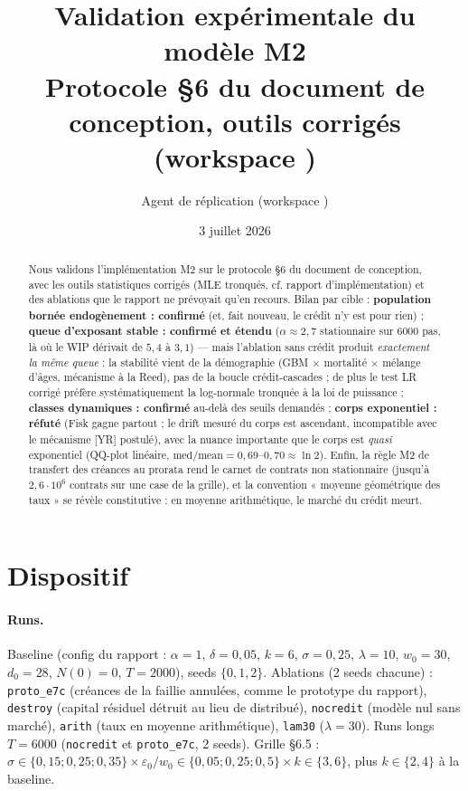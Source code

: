 \documentclass[11pt,a4paper]{article}
\title{Validation expérimentale du modèle M2\\
\large Protocole §6 du document de conception, outils corrigés\\
(workspace \code{m2\_fable})}
\author{Agent de réplication (workspace \code{m2\_fable})}
\date{3 juillet 2026}
\newcommand{\code}[1]{\texttt{#1}}
\begin{document}
\maketitle

\begin{abstract}
Nous validons l'implémentation M2 sur le protocole §6 du document de
conception, avec les outils statistiques corrigés (MLE tronqués, cf. rapport
d'implémentation) et des ablations que le rapport ne prévoyait qu'en recours.
Bilan par cible : \textbf{population bornée endogènement : confirmé} (et,
fait nouveau, le crédit n'y est pour rien) ; \textbf{queue d'exposant stable :
confirmé et étendu} ($\alpha \approx 2{,}7$ stationnaire sur $6000$ pas, là
où le WIP dérivait de $5{,}4$ à $3{,}1$) — mais l'ablation sans crédit produit
\emph{exactement la même queue} : la stabilité vient de la démographie
(GBM $\times$ mortalité $\times$ mélange d'âges, mécanisme à la Reed), pas de
la boucle crédit-cascades ; de plus le test LR corrigé préfère
systématiquement la log-normale tronquée à la loi de puissance ;
\textbf{classes dynamiques : confirmé} au-delà des seuils demandés ;
\textbf{corps exponentiel : réfuté} (Fisk gagne partout ; le drift mesuré du
corps est ascendant, incompatible avec le mécanisme [YR] postulé), avec la
nuance importante que le corps est \emph{quasi} exponentiel (QQ-plot
linéaire, $\mathrm{med}/\mathrm{mean} = 0{,}69$--$0{,}70 \approx \ln 2$).
Enfin, la règle M2 de transfert des créances au prorata rend le carnet de
contrats non stationnaire (jusqu'à $2,6 \cdot 10^6$ contrats sur une case de
la grille), et la convention « moyenne géométrique des taux » se révèle
constitutive : en moyenne arithmétique, le marché du crédit meurt.
\end{abstract}

\tableofcontents

\section{Dispositif}

\paragraph{Runs.} Baseline (config du rapport : $\alpha=1$, $\delta=0{,}05$,
$k=6$, $\sigma=0{,}25$, $\lambda=10$, $w_0=30$, $d_0=28$, $N(0)=0$, $T=2000$),
seeds $\{0,1,2\}$. Ablations (2 seeds chacune) : \code{proto\_e7c}
(créances de la faillie annulées, comme le prototype du rapport),
\code{destroy} (capital résiduel détruit au lieu de distribué),
\code{nocredit} (modèle nul sans marché), \code{arith} (taux en moyenne
arithmétique), \code{lam30} ($\lambda = 30$). Runs longs $T = 6000$
(\code{nocredit} et \code{proto\_e7c}, 2 seeds). Grille §6.5 :
$\sigma \in \{0{,}15 ; 0{,}25 ; 0{,}35\} \times \varepsilon_0/w_0 \in
\{0{,}05 ; 0{,}25 ; 0{,}5\} \times k \in \{3, 6\}$, plus $k \in \{2, 4\}$ à la
baseline.
\end{document}

